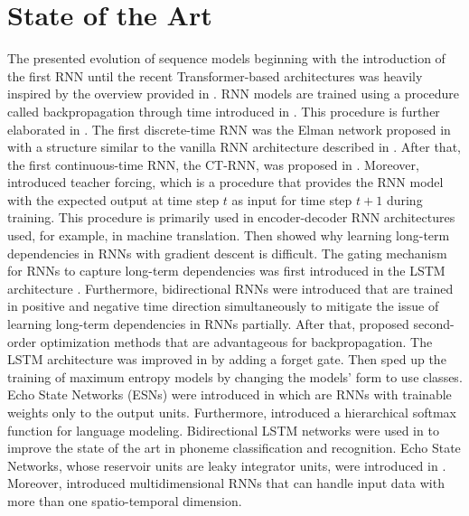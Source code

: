 \documentclass[draft,final]{vutinfth} %
\begin{document}
    \section{State of the Art}
    The presented evolution of sequence models beginning with the introduction of the first RNN until the recent Transformer-based architectures was heavily inspired by the overview provided in \cite[p. 1]{rnn_overview}.
    RNN models are trained using a procedure called backpropagation through time introduced in \cite{GradientDescent}.
    This procedure is further elaborated in \cite{BPTT}.
    The first discrete-time RNN was the Elman network proposed in \cite{elman_network} with a structure similar to the vanilla RNN architecture described in .
    After that, the first continuous-time RNN, the CT-RNN, was proposed in \cite{CTRNN}.
    Moreover, \cite{teacher_forcing} introduced teacher forcing, which is a procedure that provides the RNN model with the expected output at time step $t$ as input for time step $t+1$ during training.
    This procedure is primarily used in encoder-decoder RNN architectures used, for example, in machine translation.
    Then \cite{LongTermDependenciesGradientDescent} showed why learning long-term dependencies in RNNs with gradient descent is difficult.
    The gating mechanism for RNNs to capture long-term dependencies was first introduced in the LSTM architecture \cite{LSTM}.
    Furthermore, bidirectional RNNs \cite{bidirectional_rnn} were introduced that are trained in positive and negative time direction simultaneously to mitigate the issue of learning long-term dependencies in RNNs partially.
    After that, \cite{efficient_backprop} proposed second-order optimization methods that are advantageous for backpropagation.
    The LSTM architecture was improved in \cite{LSTM_forget} by adding a forget gate.
    Then \cite{maximum_entropy_training} sped up the training of maximum entropy models by changing the models' form to use classes.
    Echo State Networks (ESNs) were introduced in \cite{esn} which are RNNs with trainable weights only to the output units.
    Furthermore, \cite{hierarchical_softmax} introduced a hierarchical softmax function for language modeling.
    Bidirectional LSTM networks were used in \cite{bidirectional_lstm} to improve the state of the art in phoneme classification and recognition.
    Echo State Networks, whose reservoir units are leaky integrator units, were introduced in \cite{leaky_integrator}.
    Moreover, \cite{multidimensional_rnn} introduced multidimensional RNNs that can handle input data with more than one spatio-temporal dimension.
\end{document}
